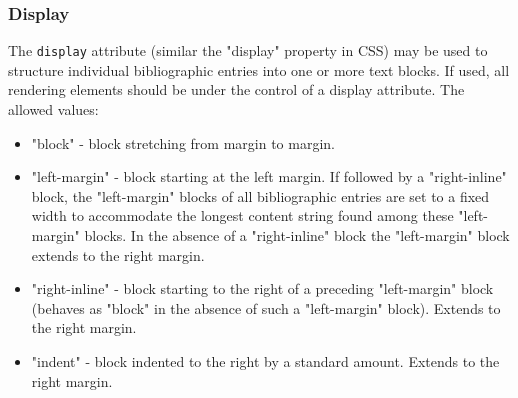 \begin{Shaded}
\begin{Highlighting}[]
\NormalTok{\textless{}}\NormalTok{\textgreater{}}
\NormalTok{  \textless{}}\NormalTok{ /\textgreater{}}
\NormalTok{  \textless{}}\NormalTok{\textgreater{}}
\NormalTok{    \textless{}}\NormalTok{ /\textgreater{}}
\NormalTok{    \textless{}}\NormalTok{ /\textgreater{}}
\NormalTok{    \textless{}}\NormalTok{ /\textgreater{}}
\NormalTok{  \textless{}/}\NormalTok{\textgreater{}}
\NormalTok{\textless{}/}\NormalTok{\textgreater{}}
\end{Highlighting}
\end{Shaded}

\hypertarget{display}{%
\subsubsection{Display}\label{display}}

The \texttt{display} attribute (similar the "display" property in CSS)
may be used to structure individual bibliographic entries into one or
more text blocks. If used, all rendering elements should be under the
control of a display attribute. The allowed values:

\begin{itemize}
\tightlist
\item
  "block" - block stretching from margin to margin.
\item
  "left-margin" - block starting at the left margin. If followed by a
  "right-inline" block, the "left-margin" blocks of all bibliographic
  entries are set to a fixed width to accommodate the longest content
  string found among these "left-margin" blocks. In the absence of a
  "right-inline" block the "left-margin" block extends to the right
  margin.
\item
  "right-inline" - block starting to the right of a preceding
  "left-margin" block (behaves as "block" in the absence of such a
  "left-margin" block). Extends to the right margin.
\item
  "indent" - block indented to the right by a standard amount. Extends
  to the right margin.
\end{itemize}

